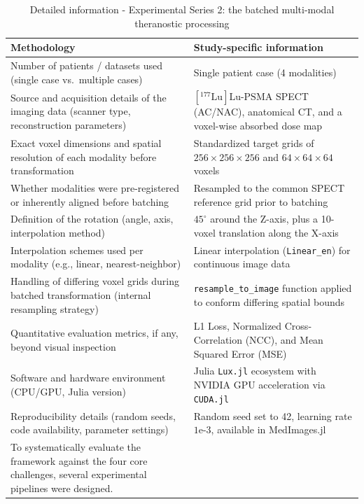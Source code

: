 \documentclass[10pt,letterpaper]{article}
\begin{document}
\begin{table}[H]
\centering
\caption{Detailed information - Experimental Series 2: the batched multi-modal theranostic processing}
\label{tab:method_info_batched_Lu177}
\begin{tabular}{|p{}|p{}|}
\hline
\textbf{Methodology} & \textbf{Study-specific information} \\
\hline
Number of patients / datasets used (single case vs.\ multiple cases) & Single patient case (4 modalities) \\
\hline
Source and acquisition details of the imaging data (scanner type, reconstruction parameters) & $[^{177}\text{Lu}]\text{Lu-PSMA}$ SPECT (AC/NAC), anatomical CT, and a voxel-wise absorbed dose map \\
\hline
Exact voxel dimensions and spatial resolution of each modality before transformation & Standardized target grids of $256 \times 256 \times 256$ and $64 \times 64 \times 64$ voxels \\
\hline
Whether modalities were pre-registered or inherently aligned before batching & Resampled to the common SPECT reference grid prior to batching \\
\hline
Definition of the rotation (angle, axis, interpolation method) & $45^\circ$ around the Z-axis, plus a 10-voxel translation along the X-axis \\
\hline
Interpolation schemes used per modality (e.g., linear, nearest-neighbor) & Linear interpolation (\texttt{Linear\_en}) for continuous image data \\
\hline
Handling of differing voxel grids during batched transformation (internal resampling strategy) & \texttt{resample\_to\_image} function applied to conform differing spatial bounds \\
\hline
Quantitative evaluation metrics, if any, beyond visual inspection & L1 Loss, Normalized Cross-Correlation (NCC), and Mean Squared Error (MSE) \\
\hline
Software and hardware environment (CPU/GPU, Julia version) & Julia \texttt{Lux.jl} ecosystem with NVIDIA GPU acceleration via \texttt{CUDA.jl} \\
\hline
Reproducibility details (random seeds, code availability, parameter settings) & Random seed set to 42, learning rate $1\text{e-}3$, available in MedImages.jl \\
To systematically evaluate the framework against the four core challenges, several experimental pipelines were designed.


\end{tabular}
\end{table}
\end{document}
